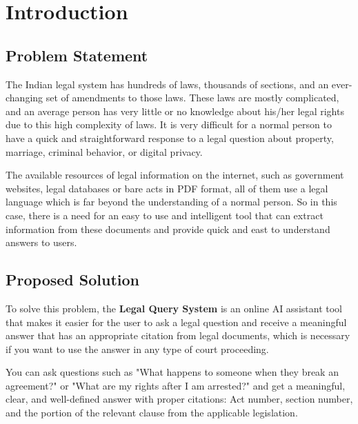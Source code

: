 \documentclass[12pt,a4paper]{article}
\begin{document}
\color{black}

\tableofcontents
\thispagestyle{empty}
\clearpage

\section{Introduction}

\subsection{Problem Statement}

The Indian legal system has hundreds of laws, thousands of sections, and an ever-changing set of amendments to those laws. These laws are mostly complicated, and an average person has very little or no knowledge about his/her legal rights due to this high complexity of laws. It is very difficult for a normal person to have a quick and straightforward response to a legal question about property, marriage, criminal behavior, or digital privacy.

The available resources of legal information on the internet, such as government websites, legal databases or bare acts in PDF format, all of them use a legal language which is far beyond the understanding of a normal person. So in this case, there is a need for an easy to use and intelligent tool that can extract information from these documents and provide quick and east to understand answers to users.


\subsection{Proposed Solution}

To solve this problem, the \textbf{Legal Query System} is an online AI assistant tool that makes it easier for the user to ask a legal question and receive a meaningful answer that has an appropriate citation from legal documents, which is necessary if you want to use the answer in any type of court proceeding.

You can ask questions such as "What happens to someone when they break an agreement?" or "What are my rights after I am arrested?" and get a meaningful, clear, and well-defined answer with proper citations: Act number, section number, and the portion of the relevant clause from the applicable legislation.
\end{document}
